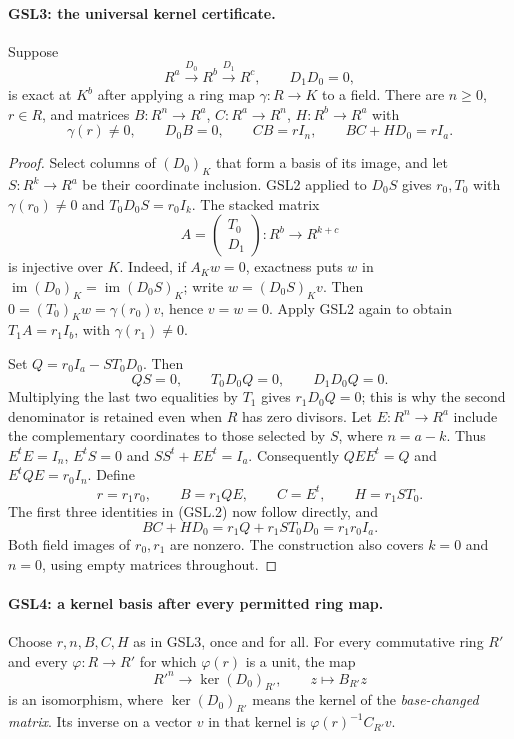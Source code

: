 \documentclass[11pt,a4paper]{article}
\numberwithin{equation}{section}
\theoremstyle{remark}\newtheorem{remark}[theorem]{Remark}
\begin{document}
\paragraph{GSL3: the universal kernel certificate.}
\label{claim:GSL3}
Suppose
\[
 R^a\xrightarrow{D_0}R^b\xrightarrow{D_1}R^c,
 \qquad D_1D_0=0,
\]
is exact at $K^b$ after applying a ring map $\gamma:R\to K$ to a
field.  There are $n\ge0$, $r\in R$, and matrices
$B:R^n\to R^a$, $C:R^a\to R^n$, $H:R^b\to R^a$ with
\[
 \gamma(r)\ne0,\qquad
 D_0B=0,\qquad CB=rI_n,\qquad BC+HD_0=rI_a. \tag{GSL.2}
\]

\begin{proof}
Select columns of $(D_0)_K$ that form a basis of its image, and let
$S:R^k\to R^a$ be their coordinate inclusion.  GSL2 applied to $D_0S$
gives $r_0,T_0$ with $\gamma(r_0)\ne0$ and
$T_0D_0S=r_0I_k$.  The stacked matrix
\[
 A=\begin{pmatrix}T_0\\D_1\end{pmatrix}:R^b\longrightarrow R^{k+c}
\]
is injective over $K$.  Indeed, if $A_Kw=0$, exactness puts $w$ in
$\operatorname{im}(D_0)_K=\operatorname{im}(D_0S)_K$; write
$w=(D_0S)_Kv$.  Then $0=(T_0)_Kw=\gamma(r_0)v$, hence $v=w=0$.
Apply GSL2 again to obtain $T_1A=r_1I_b$, with $\gamma(r_1)\ne0$.

Set $Q=r_0I_a-ST_0D_0$.  Then
\[
 QS=0,\qquad T_0D_0Q=0,\qquad D_1D_0Q=0.
\]
Multiplying the last two equalities by $T_1$ gives $r_1D_0Q=0$;
this is why the second denominator is retained even when $R$ has
zero divisors.  Let $E:R^n\to R^a$ include the complementary
coordinates to those selected by $S$, where $n=a-k$.  Thus
$E^tE=I_n$, $E^tS=0$ and $SS^t+EE^t=I_a$.  Consequently
$QEE^t=Q$ and $E^tQE=r_0I_n$.  Define
\[
 r=r_1r_0,\qquad B=r_1QE,\qquad C=E^t,\qquad H=r_1ST_0.
\]
The first three identities in (GSL.2) now follow directly, and
\[
 BC+HD_0=r_1Q+r_1ST_0D_0=r_1r_0I_a.
\]
Both field images of $r_0,r_1$ are nonzero.  The construction also
covers $k=0$ and $n=0$, using empty matrices throughout.
\end{proof}

\paragraph{GSL4: a kernel basis after every permitted ring map.}
\label{claim:GSL4}
Choose $r,n,B,C,H$ as in GSL3, once and for all.  For every commutative
ring $R'$ and every $\varphi:R\to R'$ for which $\varphi(r)$ is a
unit, the map
\[
 R'^n\longrightarrow\ker(D_0)_{R'},\qquad z\longmapsto B_{R'}z
 \tag{GSL.3}
\]
is an isomorphism, where $\ker(D_0)_{R'}$ means the kernel of the
\emph{base-changed matrix}.  Its inverse on a vector $v$ in that kernel
is $\varphi(r)^{-1}C_{R'}v$.
\end{document}
